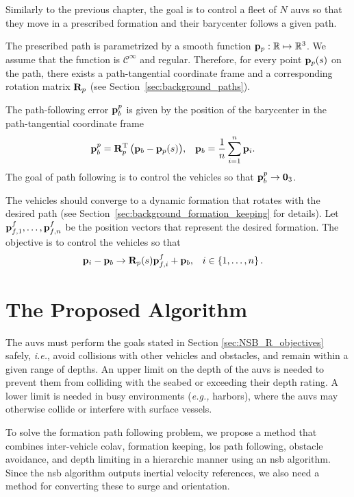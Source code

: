 Similarly to the previous chapter, the goal is to control a fleet of $N$ \glspl{auv} so that they move in a prescribed formation and their barycenter follows a given path.

The prescribed path is parametrized by a smooth function $\mathbf{p}_p: \mathbb{R} \mapsto \mathbb{R}^3$.
We assume that the function is $\mathcal{C}^{\infty}$ and regular.
Therefore, for every point $\mathbf{p}_p(s)$ on the path, there exists a path-tangential coordinate frame and a corresponding rotation matrix $\mathbf{R}_p$ (see Section~\ref{sec:background_paths}).

The path-following error $\mathbf{p}_b^p$ is given by the position of the barycenter in the path-tangential coordinate frame 
\begin{align}
    \mathbf{p}_b^p &= \mathbf{R}_p^{\mathrm{T}} \, \big(\mathbf{p}_b - \mathbf{p}_p(s)\big), &
    \mathbf{p}_b &= \frac{1}{n} \sum_{i=1}^n \mathbf{p}_i.
    \label{eq:NSB_R_barycenter}
\end{align}
The goal of path following is to control the vehicles so that $\mathbf{p}_b^p \rightarrow \mathbf{0}_3$.

The vehicles should converge to a dynamic formation that rotates with the desired path (see Section~\ref{sec:background_formation_keeping} for details).
Let $\mathbf{p}_{f,1}^f, \ldots, \mathbf{p}_{f,n}^f$ be the position vectors that represent the desired formation.
The objective is to control the vehicles so that
\begin{align}
    \mathbf{p}_i - \mathbf{p}_b &\rightarrow \mathbf{R}_p(s) \mathbf{p}_{f,i}^f + \mathbf{p}_b, &
    i &\in \left\{1, \ldots, n \right\}.
\end{align}

\section{The Proposed Algorithm}
\label{sec:NSB_R_control}

The \glspl{auv} must perform the goals stated in Section \ref{sec:NSB_R_objectives} safely, \emph{i.e.},
avoid collisions with other vehicles and obstacles, and remain within a given range of depths.
An upper limit on the depth of the \glspl{auv} is needed to prevent them from colliding with the seabed or exceeding their depth rating.
A lower limit is needed in busy environments (\emph{e.g.,} harbors), where the \glspl{auv} may otherwise collide or interfere with surface vessels.

To solve the formation path following problem, we propose a method that combines inter-vehicle \acrfull{colav}, formation keeping, \acrfull{los} path following, obstacle avoidance, and depth limiting in a hierarchic manner using an \gls{nsb} algorithm.
Since the \gls{nsb} algorithm outputs inertial velocity references, we also need a method for converting these to surge and orientation.

